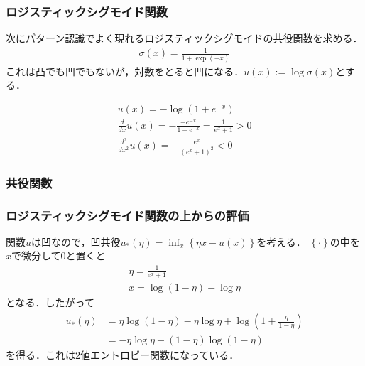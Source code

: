 \documentclass[10pt,usepdftitle=false,hyperref={unicode}]{beamer}
\newcommand{\parentheses}[1]{\left(#1\right)}
\newcommand{\braces}[1]{\left\{#1\right\}}
\begin{document}
\begin{frame}
\frametitle{ロジスティックシグモイド関数}
次にパターン認識でよく現れるロジスティックシグモイドの共役関数を求める．
\begin{align}
    \sigma\parentheses{x} = \frac{1}{1 + \exp \parentheses{-x}} \tag{10.134}
\end{align}
これは凸でも凹でもないが，対数をとると凹になる．$u(x) := \log \sigma \parentheses{x}$とする．

\begin{gather*}
    u\parentheses{x} = -\log\parentheses{1 + e^{-x}} \\
    \frac{d}{dx}u\parentheses{x}
    = -\frac{-e^{-x}}{1 + e^{-x}}
    = \frac{1}{e^x + 1} > 0 \\
    \frac{d^2}{dx^2}u\parentheses{x}
    = -\frac{e^x}{\parentheses{e^x + 1}^2} < 0
\end{gather*}
\end{frame}

\begin{frame}
\frametitle{共役関数}
\begin{center}
\end{center}
\end{frame}

\begin{frame}
\frametitle{ロジスティックシグモイド関数の上からの評価}
関数$u$は凹なので，凹共役$u_*\parentheses{\eta} = \inf_x \braces{\eta x - u\parentheses{x}}$を考える．
$\braces{\cdot}$の中を$x$で微分して$0$と置くと
\begin{gather*}
    \eta = \frac{1}{e^x + 1} \\
    x = \log \parentheses{1-\eta} - \log \eta
\end{gather*}
となる．したがって
\begin{align*}
    u_*\parentheses{\eta} &= \eta \log \parentheses{1-\eta} - \eta \log \eta + \log \parentheses{1 + \frac{\eta}{1 - \eta}} \\
                          &= - \eta \log \eta - \parentheses{1 - \eta} \log \parentheses{1-\eta}
\end{align*}
を得る．これは2値エントロピー関数になっている．
\end{frame}
\end{document}
